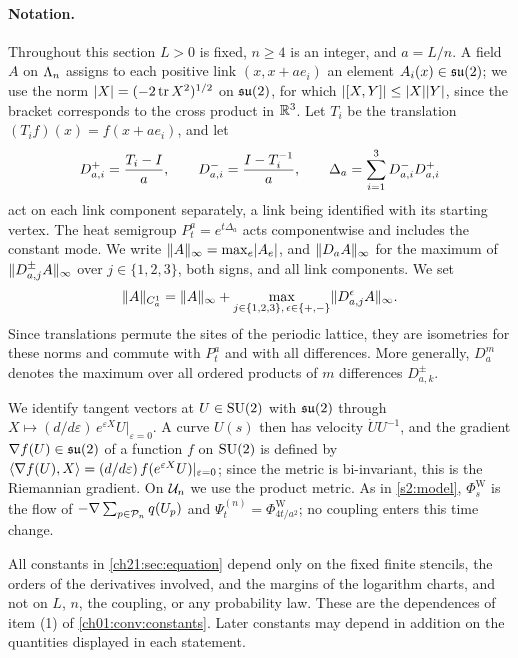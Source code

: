 \paragraph{Notation.}
Throughout this section $L>0$ is fixed, $n\ge4$ is an integer, and $a=L/n$. A field $A$ on $\Lambda_{n}$ assigns to each positive link $(x,x+ae_i)$ an element $A_i(x)\in\mathfrak{su}(2)$; we use the norm $\lvert X\rvert=(-2\operatorname{tr} X^2)^{1/2}$ on $\mathfrak{su}(2)$, for which $\lvert [X,Y]\rvert\le\lvert X\rvert\lvert Y\rvert$, since the bracket corresponds to the cross product in $\mathbb R^3$. Let $T_i$ be the translation $(T_if)(x)=f(x+ae_i)$, and let
\[
 D_{a,i}^+=\frac{T_i-I}{a},\qquad D_{a,i}^-=\frac{I-T_i^{-1}}{a},\qquad
 \Delta_a=\sum_{i=1}^3D_{a,i}^-D_{a,i}^+
\]
act on each link component separately, a link being identified with its starting vertex. The heat semigroup $P^a_t=e^{t\Delta_a}$ acts componentwise and includes the constant mode. We write $\lVert A\rVert_\infty=\max_e\lvert A_e\rvert$, and $\lVert D_aA\rVert_\infty$ for the maximum of $\lVert D_{a,j}^{\pm}A\rVert_\infty$ over $j\in\{1,2,3\}$, both signs, and all link components. We set
\begin{equation}\label{ch21:eq:c1a-norm}
 \lVert A\rVert_{C_a^1}=\lVert A\rVert_\infty+\max_{j\in\{1,2,3\},\,\epsilon\in\{+,-\}}\lVert D_{a,j}^{\epsilon}A\rVert_\infty .
\end{equation}
Since translations permute the sites of the periodic lattice, they are isometries for these norms and commute with $P^a_t$ and with all differences. More generally, $D_a^m$ denotes the maximum over all ordered products of $m$ differences $D^{\pm}_{a,k}$.

We identify tangent vectors at $U\in\mathrm{SU}(2)$ with $\mathfrak{su}(2)$ through $X\mapsto(d/d\varepsilon)\,e^{\varepsilon X}U|_{\varepsilon=0}$. A curve $U(s)$ then has velocity $\dot UU^{-1}$, and the gradient $\nabla f(U)\in\mathfrak{su}(2)$ of a function $f$ on $\mathrm{SU}(2)$ is defined by $\langle \nabla f(U),X\rangle=(d/d\varepsilon)\,f(e^{\varepsilon X}U)|_{\varepsilon=0}$; since the metric is bi-invariant, this is the Riemannian gradient. On $\mathcal U_{n}$ we use the product metric. As in \cref{s2:model}, $\Phi^{\mathrm W}_s$ is the flow of $-\nabla\sum_{p\in\mathcal P_{n}}q(U_p)$ and $\Psi^{(n)}_t=\Phi^{\mathrm W}_{4t/a^2}$; no coupling enters this time change.

All constants in \cref{ch21:sec:equation} depend only on the fixed finite stencils, the orders of the derivatives involved, and the margins of the logarithm charts, and not on $L$, $n$, the coupling, or any probability law. These are the dependences of item (1) of \cref{ch01:conv:constants}. Later constants may depend in addition on the quantities displayed in each statement.

